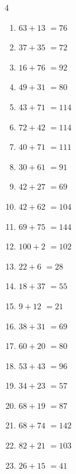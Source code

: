 \begin{multicols}{4}
\begin{enumerate}
  \item $63+13$
        $=76$

  \item $37+35$
        $=72$

  \item $16+76$
        $=92$

  \item $49+31$
        $=80$

  \item $43+71$
        $=114$

  \item $72+42$
        $=114$

  \item $40+71$
        $=111$

  \item $30+61$
        $=91$

  \item $42+27$
        $=69$

  \item $42+62$
        $=104$

  \item $69+75$
        $=144$

  \item $100+2$
        $=102$

  \item $22+6$
        $=28$

  \item $18+37$
        $=55$

  \item $9+12$
        $=21$

\columnbreak %

  \item $38+31$
        $=69$

  \item $60+20$
        $=80$

  \item $53+43$
        $=96$

  \item $34+23$
        $=57$

  \item $68+19$
        $=87$

  \item $68+74$
        $=142$

  \item $82+21$
        $=103$

  \item $26+15$
        $=41$


\end{enumerate}
\end{multicols}
